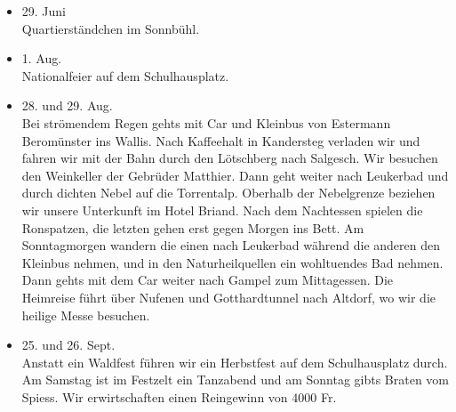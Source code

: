 \begin{history}
\begin{itemize}
        \item 29. Juni\\
              Quartierständchen im Sonnbühl.

        \item 1. Aug.\\
              Nationalfeier auf dem Schulhausplatz.

        \item 28. und 29. Aug.\\
              Bei strömendem Regen gehts mit Car und Kleinbus von Estermann
              Beromünster ins Wallis. Nach Kaffeehalt in Kandersteg verladen wir und
              fahren wir mit der Bahn durch den Lötschberg nach Salgesch. Wir besuchen
              den Weinkeller der Gebrüder Matthier. Dann geht weiter nach Leukerbad
              und durch dichten Nebel auf die Torrentalp. Oberhalb der Nebelgrenze
              beziehen wir unsere Unterkunft im Hotel Briand. Nach dem Nachtessen
              spielen die Ronspatzen, die letzten gehen erst gegen Morgen ins Bett. Am
              Sonntagmorgen wandern die einen nach Leukerbad während die anderen den
              Kleinbus nehmen, und in den Naturheilquellen ein wohltuendes Bad nehmen.
              Dann gehts mit dem Car weiter nach Gampel zum Mittagessen. Die Heimreise
              führt über Nufenen und Gotthardtunnel nach Altdorf, wo wir die heilige
              Messe besuchen.

        \item 25. und 26. Sept.\\
              Anstatt ein Waldfest führen wir ein Herbstfest auf dem Schulhausplatz
              durch. Am Samstag ist im Festzelt ein Tanzabend und am Sonntag gibts
              Braten vom Spiess. Wir erwirtschaften einen Reingewinn von 4000 Fr.

    \end{itemize}

\end{history}
